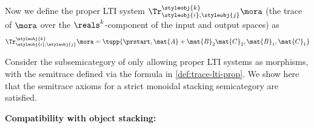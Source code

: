 {\begin{definition}
    Now we define the proper LTI system $\Tr_{\styleobj{i},\styleobj{j}}^{\styleobj{k}}\mora$ (the trace of $\mora$ over the $\reals^k$-component of the input and output spaces) as
    \begin{equation}\label{eq:proper-LTI-trace-formula}
        \Tr_{\styleobj{i},\styleobj{j}}^{\styleobj{k}}\mora = \tupp{\prstart,\mat{A} + \mat{B}_2 \mat{C}_2, \mat{B}_1,\mat{C}_1}
    \end{equation}
\end{definition}

\begin{example}
    Consider the subsemicategory of \LTI only allowing proper LTI systems as morphisms, with the semitrace defined via the formula in \cref{def:trace-lti-prop}.
    We show here that the semitrace axioms for a strict monoidal stacking semicategory are satisfied.

    \textbf{Compatibility with object stacking:}


\end{example}}
